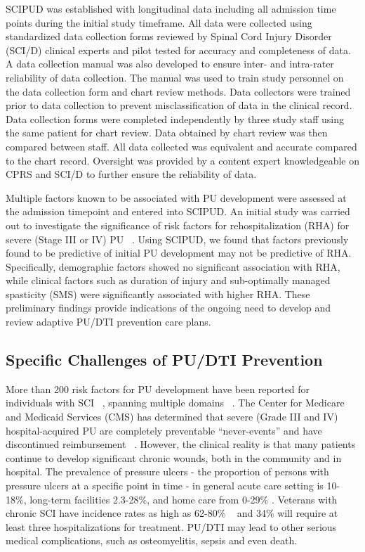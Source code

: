 \documentclass{amia}
\begin{document}
SCIPUD was established with longitudinal data including all admission time points during the initial study timeframe. All data were collected using standardized data collection forms reviewed by Spinal Cord Injury Disorder (SCI/D) clinical experts and pilot tested for accuracy and completeness of data. A data collection manual was also developed to ensure inter- and intra-rater reliability of data collection. The manual was used to train study personnel on the data collection form and chart review methods. Data collectors were trained prior to data collection to prevent misclassification of data in the clinical record. Data collection forms were completed independently by three study staff using the same patient for chart review. Data obtained by chart review was then compared between staff. All data collected was equivalent and accurate compared to the chart record. Oversight was provided by a content expert knowledgeable on CPRS and SCI/D to further ensure the reliability of data.

Multiple factors known to be associated with PU development were assessed at the admission timepoint and entered into SCIPUD. An initial study was carried out to investigate the significance of risk factors for rehospitalization (RHA) for severe (Stage III or IV) PU ~\cite{stages}. Using SCIPUD, we found that factors previously found to be predictive of initial PU development may not be predictive of RHA. Specifically, demographic factors showed no significant association with RHA, while clinical factors such as duration of injury and sub-optimally managed spasticity (SMS) were significantly associated with higher RHA. These preliminary findings provide indications of the ongoing need to develop and review adaptive PU/DTI prevention care plans.

\subsection{Specific Challenges of PU/DTI Prevention}

More than 200 risk factors for PU development have been reported for individuals with SCI ~\cite{risk-factors-number}, spanning multiple domains ~\cite{risk-factors-domain}. The Center for Medicare and Medicaid Services (CMS) has determined that severe (Grade III and IV) hospital-acquired PU are completely preventable ``never-events'' and have discontinued reimbursement ~\cite{never-event}. However, the clinical reality is that many patients continue to develop significant chronic wounds, both in the community and in hospital. The prevalence of pressure ulcers - the proportion of persons with pressure ulcers at a specific point in time - in general acute care setting is 10-18\%, long-term facilities 2.3-28\%, and home care from 0-29\% \cite{ac-rate-ir, ac-rate-pr}. Veterans with chronic SCI have incidence rates as high as 62-80\% ~\cite{va-pr-up, va-pr-bot} and 34\% will require at least three hospitalizations for treatment. PU/DTI may lead to other serious medical complications, such as osteomyelitis, sepsis and even death.
\end{document}
